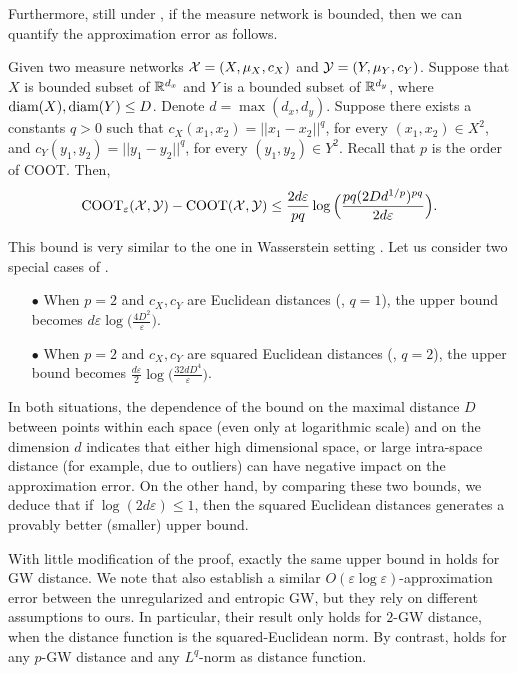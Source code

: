 Furthermore, still under , if the measure network is bounded,
then we can quantify the approximation error as follows.
\begin{proposition} \label{prop:quant_bound_ent}
  Given two measure networks $\mathcal X = (X, \mu_X, c_X)$ and $\mathcal Y = (Y, \mu_Y, c_Y)$.
  Suppose that $X$ is bounded subset of $\mathbb R^{d_x}$ and $Y$ is a bounded subset
  of $\mathbb R^{d_y}$, where $\text{diam}(X), \text{diam}(Y) \leq D$.
  Denote $d = \max(d_x, d_y)$. Suppose there exists a constants $q > 0$ such that
  $c_X(x_1, x_2) = \vert\vert x_1 - x_2 \vert\vert^q$, for every $(x_1,x_2) \in X^2$, and
  $c_Y(y_1, y_2) = \vert\vert y_1 - y_2 \vert\vert^q$, for every $(y_1,y_2) \in Y^2$.
  Recall that $p$ is the order of COOT. Then,
  \begin{equation}
    \text{COOT}_{\varepsilon}(\mathcal X, \mathcal Y) - \text{COOT}(\mathcal X, \mathcal Y) \leq
    \frac{2d \varepsilon}{pq} \log\Big( \frac{pq (2D d^{1/p})^{pq}}{2d \varepsilon} \Big).
  \end{equation}
\end{proposition}
This bound is very similar to the one in Wasserstein setting \citep{Genevay19}.
Let us consider two special cases of .
\begin{itemize}
  \item[$\bullet$] When $p=2$ and $c_X, c_Y$ are Euclidean distances (\ie, $q=1$),
  the upper bound becomes $d\varepsilon \log\Big( \frac{4D^2}{\varepsilon} \Big)$.

  \item[$\bullet$] When $p=2$ and $c_X, c_Y$ are squared Euclidean distances
  (\ie, $q=2$), the upper bound becomes
  $\frac{d\varepsilon}{2} \log\Big( \frac{32dD^4}{\varepsilon} \Big)$.
\end{itemize}
In both situations, the dependence of the bound on the maximal distance $D$ between points
within each space (even only at logarithmic scale) and on the dimension $d$ indicates
that either high dimensional space, or large intra-space distance (for example, due to outliers)
can have negative impact on the approximation error. On the other hand,
by comparing these two bounds, we deduce that if $\log(2d \varepsilon) \leq 1$,
then the squared Euclidean distances generates a provably better (smaller) upper bound.

With little modification of the proof, exactly the same upper bound in 
holds for GW distance. We note that \citet{Zhang23} also establish a similar
$O(\varepsilon \log \varepsilon)$-approximation error between the unregularized and entropic GW,
but they rely on different assumptions to ours. In particular, their result only holds
for $2$-GW distance, when the distance function is the squared-Euclidean norm. By contrast,
 holds for any $p$-GW distance and any $L^q$-norm as distance function.

